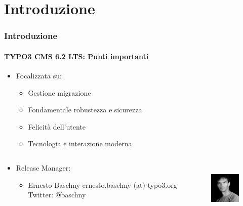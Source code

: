 \section{Introduzione}
\begin{frame}[fragile]
	\frametitle{Introduzione}
	\framesubtitle{TYPO3 CMS 6.2 LTS: Punti importanti}

	\begin{itemize}
		\item Focalizzata su:

			\begin{itemize}
				\item Gestione migrazione
				\item Fondamentale robustezza e sicurezza
				\item Felicità dell'utente
				\item Tecnologia e interazione moderna
			\end{itemize}

	\end{itemize}

	\begin{columns}[T]

		\begin{column}{.5\textwidth}
			\begin{itemize}
				\item Release Manager:
				\begin{itemize}
					\item Ernesto Baschny\newline
						ernesto.baschny (at) typo3.org\newline
						Twitter: @baschny
				\end{itemize}
			\end{itemize}
		\end{column}

		\begin{column}{.5\textwidth}
			\begin{figure}
				\includegraphics[width=2.6cm,height=2.6cm]{Images/Introduction/ErnestoBaschny.jpg}
			\end{figure}
		\end{column}

	\end{columns}

\end{frame}

